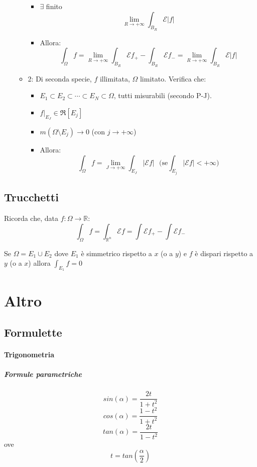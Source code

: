 \documentclass[a4paper,12pt]{book}
\begin{document}
\begin{itemize}
\begin{itemize}
\begin{itemize}
\begin{itemize}
   \end{itemize}
   \item $\exists$ finito $$\lim_{R \to +\infty} \int_{B_R} \mathcal{E}|f| $$
   \item Allora: $$\int_\Omega f = \lim_{R \to +\infty} \int_{B_R} \mathcal{E}f_+ - \int_{B_R} \mathcal{E}f_- = \lim_{R \to +\infty} \int_{B_R} \mathcal{E}|f|$$
  \end{itemize}
  \item 2: Di seconda specie, $f$ illimitata, $\Omega$ limitato. Verifica che:
  \begin{itemize}
   \item $E_1 \subset E_2 \subset \cdots \subset E_N \subset \Omega$, tutti misurabili (secondo P-J).
   \item $f|_{E_J} \in \Re[E_j]$
   \item $m(\Omega\setminus E_j) \to 0$ (con $j \to +\infty$)
   \item Allora: $$\int_\Omega f = \lim_{J \to +\infty} \int_{E_J} |\mathcal{E}f|\ \ \ \mathrm{(se}\int_{E_j}|\mathcal{E}f| < +\infty\mathrm{)}$$
  \end{itemize}
 \end{itemize}
\end{itemize}

\subsection{Trucchetti}
Ricorda che, data $f: \Omega \rightarrow \mathbb{R}$:
 $$\int_\Omega f = \int_{\mathbb{R}^n} \mathcal{E}f = \int \mathcal{E}f_+ - \int \mathcal{E}f_- $$

Se $\Omega=E_1\cup E_2$ dove $E_1$ è simmetrico rispetto a $x$ (o a $y$) e $f$ è dispari rispetto a $y$ (o a $x$) allora $\int_{E_1} f = 0$

\section{Altro}
\subsection{Formulette}
\paragraph{Trigonometria}
\subparagraph{Formule parametriche}
$$sin(\alpha) = \frac{2t}{1+t^2}$$
$$cos(\alpha) = \frac{1-t^2}{1+t^2}$$
$$tan(\alpha) = \frac{2t}{1-t^2}$$
ove $$t = tan\left(\frac{\alpha}{2}\right)$$
\end{document}
